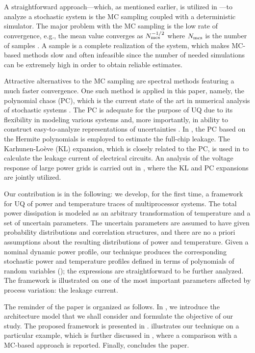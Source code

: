 A straightforward approach---which, as mentioned earlier, is utilized in \cite{chandra2010}---to analyze a stochastic system is the MC sampling coupled with a deterministic simulator. The major problem with the MC sampling is the low rate of convergence, e.g., the mean value converges as $N_\text{mcs}^{-{{1}/{2}}}$ where $N_\text{mcs}$ is the number of samples \cite{xiu2010, maitre2010}. A sample is a complete realization of the system, which makes MC-based methods slow and often infeasible since the number of needed simulations can be extremely high in order to obtain reliable estimates.

Attractive alternatives to the MC sampling are spectral methods \cite{xiu2010, maitre2010, ghanem1991} featuring a much faster convergence. One such method is applied in this paper, namely, the polynomial chaos (PC), which is the current state of the art in numerical analysis of stochastic systems \cite{xiu2010}. The PC is adequate for the purpose of UQ due to its flexibility in modeling various systems and, more importantly, in ability to construct easy-to-analyze representations of uncertainties \cite{eldred2009}. In \cite{shen2009}, the PC based on the Hermite polynomials is employed to estimate the full-chip leakage. The Karhunen-Lo\`{e}ve (KL) expansion, which is closely related to the PC, is used in \cite{bhardwaj2006} to calculate the leakage current of electrical circuits. An analysis of the voltage response of large power grids is carried out in \cite{ghanta2006}, where the KL and PC expansions are jointly utilized.

Our contribution is in the following: we develop, for the first time, a framework for UQ of power and temperature traces of multiprocessor systems. The total power dissipation is modeled as an arbitrary transformation of temperature and a set of uncertain parameters. The uncertain parameters are assumed to have given probability distributions and correlation structures, and there are no a priori assumptions about the resulting distributions of power and temperature. Given a nominal dynamic power profile, our technique produces the corresponding stochastic power and temperature profiles defined in terms of polynomials of random variables (\rvs); the expressions are straightforward to be further analyzed. The framework is illustrated on one of the most important parameters affected by process variation: the leakage current.

The reminder of the paper is organized as follows. In , we introduce the architecture model that we shall consider and formulate the objective of our study. The proposed framework is presented in .  illustrates our technique on a particular example, which is further discussed in , where a comparison with a MC-based approach is reported. Finally,  concludes the paper.
